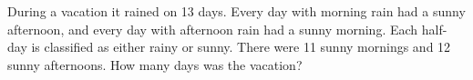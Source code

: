 During a vacation it rained on 13 days. Every day with morning rain had a sunny afternoon, and every day with afternoon rain had a sunny morning. Each half-day is classified as either rainy or sunny. There were 11 sunny mornings and 12 sunny afternoons. How many days was the vacation?
